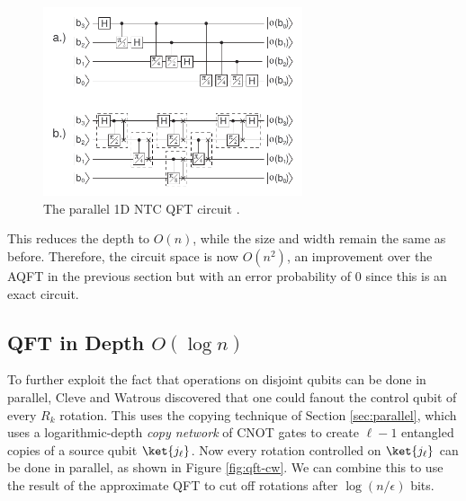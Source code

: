 \begin{figure}
\includegraphics[width=3in]{figures/parallel_qft.pdf}
\caption{The parallel 1D NTC QFT circuit \cite{Fowler2004}.}
\label{fig:qft-parallel}
\end{figure}

This reduces the depth to $O(n)$, while the size and width remain the same
as before. Therefore, the circuit space is now $O(n^2)$, an improvement over
the AQFT in the previous section but with an error probability of $0$ since
this is an exact circuit.

\subsection{QFT in Depth $O(\log n)$}
\label{subsec:qft-log}

To further exploit the fact that operations on disjoint qubits can be done
in parallel, Cleve and Watrous discovered that one could fanout the control
qubit of every $R_k$ rotation. This uses the copying technique of
Section \ref{sec:parallel}, which uses a logarithmic-depth \emph{copy network}
of
CNOT gates to create $\ell-1$ entangled copies of a source qubit
$\ket{j_\ell}$. Now every rotation controlled on $\ket{j_\ell}$ can be done
in parallel, as shown in Figure \ref{fig:qft-cw}. We can combine
this to use the
result of the approximate QFT to cut off rotations after $\log(n/\epsilon)$
bits.

